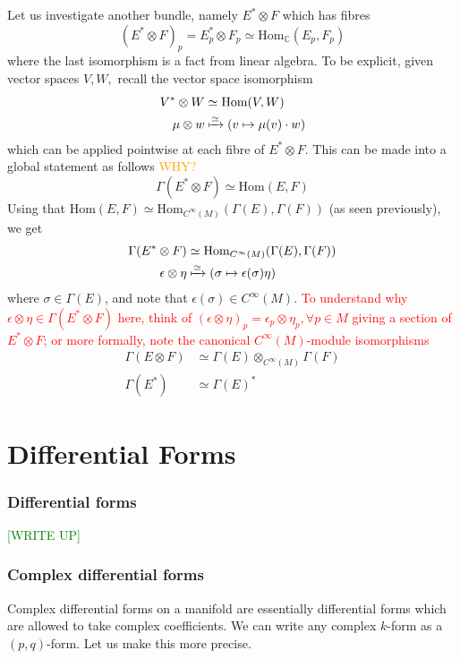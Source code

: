 \documentclass[a4paper]{article}
\theoremstyle{definition} \newtheorem*{definition}{Definition}
\theoremstyle{definition} \newtheorem*{definitions}{Definitions}
\theoremstyle{plain} \newtheorem{theorem}{Theorem}[section]
\theoremstyle{plain} \newtheorem{proposition}[theorem]{Proposition}
\theoremstyle{plain} \newtheorem{corollary}[theorem]{Corollary}
\theoremstyle{plain} \newtheorem{lemma}[theorem]{Lemma}
\theoremstyle{plain} \newtheorem{example}[theorem]{Example}
\newcommand{\checkCorrect}[1]{\textcolor{red}{#1}}
\newcommand{\understandBetter}[1]{\textcolor{orange}{#1}}
\newcommand{\finish}[1]{\textcolor{green}{#1}}
\newcommand{\complexnos}{\mathbb{C}}
\begin{document}
Let us investigate another bundle, namely $E^*\otimes F$ which has fibres 
$$(E^*\otimes F)_p=E_p^*\otimes F_p\simeq \text{Hom}_\complexnos (E_p, F_p)$$
where the last isomorphism is a fact from linear algebra. To be explicit, given vector spaces $V, W,$ recall the vector space isomorphism
\begin{align*}
V^*\otimes W & \simeq \text{Hom}(V, W) \\
\mu \otimes w & \xmapsto{\simeq} (v \mapsto \mu(v)\cdot w)
\end{align*}
which can be applied pointwise at each fibre of $E^*\otimes F$. This can be made into a global statement as follows  \understandBetter{WHY?}
$$\Gamma(E^*\otimes F)\simeq \text{Hom}(E,F)$$
Using that $\text{Hom}(E,F)\simeq \text{Hom}_{C^\infty (M)}(\Gamma(E), \Gamma(F))$ (as seen previously), we get
\begin{align*}
\Gamma(E^*\otimes F) & \simeq \text{Hom}_{C^\infty (M)}(\Gamma(E), \Gamma(F)) \\
\epsilon \otimes \eta & \xmapsto{\simeq} (\sigma \mapsto \epsilon(\sigma) \eta)
\end{align*}
where $\sigma\in \Gamma(E)$, and note that $\epsilon(\sigma)\in C^\infty (M)$. \checkCorrect{To understand why $\epsilon \otimes \eta\in \Gamma(E^*\otimes F)$ here, think of $(\epsilon \otimes \eta)_p=\epsilon_p \otimes \eta_p, \forall p\in M$ giving a section of $E^*\otimes F$; or more formally, note the canonical $C^\infty(M)$-module isomorphisms}
\begin{align*}
\Gamma(E\otimes F) & \simeq \Gamma(E)\otimes_{C^\infty (M)} \Gamma(F) \\
\Gamma(E^*) & \simeq \Gamma(E)^* 
\end{align*}

\section{Differential Forms}

\subsubsection{Differential forms}
\finish{[WRITE UP]}

\subsubsection{Complex differential forms}
Complex differential forms on a manifold are essentially differential forms which are allowed to take complex coefficients. We can write any complex $k$-form as a $(p,q)$-form. Let us make this more precise.
\end{document}

